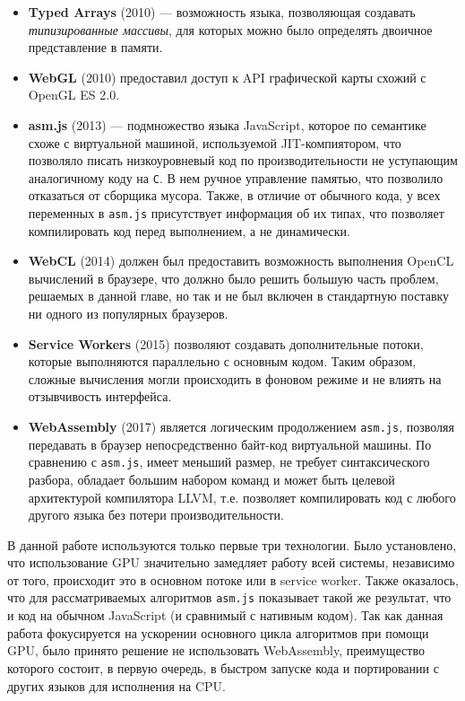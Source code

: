 \begin{itemize}
\item {\bfseries Typed Arrays} (2010) --- возможность языка, позволяющая создавать {\itshape типизированные массивы}, для которых можно было определять двоичное представление в памяти.
\item {\bfseries WebGL} (2010) предоставил доступ к API графической карты схожий с OpenGL ES 2.0.
\item {\bfseries asm.js} (2013) --- подмножество языка JavaScript, которое по семантике схоже с виртуальной машиной, используемой JIT-компиятором, что позволяло писать низкоуровневый код по производительности не уступающим аналогичному коду на \texttt{C}. В нем ручное управление памятью, что позволило отказаться от сборщика мусора. Также, в отличие от обычного кода, у всех переменных в \texttt{asm.js} присутствует информация об их типах, что позволяет компилировать код перед выполнением, а не динамически.
\item {\bfseries WebCL} (2014) должен был предоставить возможность выполнения OpenCL вычислений в браузере, что должно было решить большую часть проблем, решаемых в данной главе, но так и не был включен в стандартную поставку ни одного из популярных браузеров.
\item {\bfseries Service Workers} (2015) позволяют создавать дополнительные потоки, которые выполняются параллельно с основным кодом. Таким образом, сложные вычисления могли происходить в фоновом режиме и не влиять на отзывчивость интерфейса.
\item {\bfseries WebAssembly} (2017) является логическим продолжением \texttt{asm.js}, позволяя передавать в браузер непосредственно байт-код виртуальной машины. По сравнению с \texttt{asm.js}, имеет меньший размер, не требует синтаксического разбора, обладает большим набором команд и может быть целевой архитектурой компилятора LLVM, т.е. позволяет компилировать код с любого другого языка без потери производительности.
\end{itemize}

В данной работе используются только первые три технологии. Было установлено, что использование GPU значительно замедляет работу всей системы, независимо от того, происходит это в основном потоке или в service worker. Также оказалось, что для рассматриваемых алгоритмов \texttt{asm.js} показывает такой же результат, что и код на обычном JavaScript (и сравнимый с нативным кодом). Так как данная работа фокусируется на ускорении основного цикла алгоритмов при помощи GPU, было принято решение не использовать WebAssembly, преимущество которого состоит, в первую очередь, в быстром запуске кода и портировании с других языков для исполнения на CPU.

